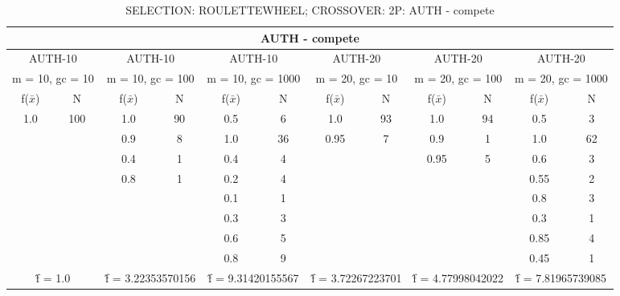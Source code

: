 \begin{table}[H]
	\centering
	\caption{SELECTION: ROULETTEWHEEL; CROSSOVER: 2P: AUTH - compete}
	\begin{adjustbox}{width=1\textwidth}
		\begin{tabular}{ |c|c||c|c||c|c||c|c||c|c||c|c| }
			\hline
			\multicolumn{12}{|c|}{AUTH - compete} \\
			\hline
			\multicolumn{2}{|c||}{AUTH-10} & \multicolumn{2}{c||}{AUTH-10} & \multicolumn{2}{c||}{AUTH-10} & \multicolumn{2}{c||}{AUTH-20} & \multicolumn{2}{c||}{AUTH-20} & \multicolumn{2}{c|}{AUTH-20}\\
			\hline
			\multicolumn{2}{|c||}{m = 10, gc = 10} & \multicolumn{2}{c||}{m = 10, gc = 100} & \multicolumn{2}{c||}{m = 10, gc = 1000} & \multicolumn{2}{c||}{m = 20, gc = 10} & \multicolumn{2}{c||}{m = 20, gc = 100} & \multicolumn{2}{c|}{m = 20, gc = 1000}\\
			\hline
			f($\bar{x}$) & N & f($\bar{x}$) & N & f($\bar{x}$) & N & f($\bar{x}$) & N & f($\bar{x}$) & N & f($\bar{x}$) & N\\
			\hline
			\hline
			1.0 & 100 & 1.0 & 90 & 0.5 & 6 & 1.0 & 93 & 1.0 & 94 & 0.5 & 3\\
			&   & 0.9 & 8 & 1.0 & 36 & 0.95 & 7 & 0.9 & 1 & 1.0 & 62\\
			&   & 0.4 & 1 & 0.4 & 4 &   &   & 0.95 & 5 & 0.6 & 3\\
			&   & 0.8 & 1 & 0.2 & 4 &   &   &   &   & 0.55 & 2\\
			&   &   &   & 0.1 & 1 &   &   &   &   & 0.8 & 3\\
			&   &   &   & 0.3 & 3 &   &   &   &   & 0.3 & 1\\
			&   &   &   & 0.6 & 5 &   &   &   &   & 0.85 & 4\\
			&   &   &   & 0.8 & 9 &   &   &   &   & 0.45 & 1\\
			\hline
			\multicolumn{2}{|c||}{\^{f} = 1.0} & \multicolumn{2}{c||}{\^{f} = 3.22353570156} & \multicolumn{2}{c||}{\^{f} = 9.31420155567} & \multicolumn{2}{c||}{\^{f} = 3.72267223701} & \multicolumn{2}{c||}{\^{f} = 4.77998042022} & \multicolumn{2}{c|}{\^{f} = 7.81965739085}\\
			\hline
		\end{tabular}
	\end{adjustbox}
\end{table}
